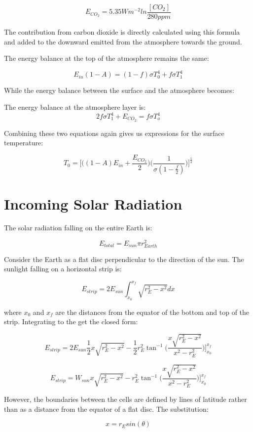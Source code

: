 \documentclass[12pt]{article} %
\begin{document}
$$ E_{CO_2} = 5.35 W m^{-2} ln \frac{[CO_2]}{280ppm}$$

The contribution from carbon dioxide is directly calculated using this formula and added to the downward emitted from the atmosphere towards the ground.


The energy balance at the top of the atmosphere remains the same:

$$ E_{in}(1-A)  = (1-f) \sigma T_0^4 + f \sigma T_1^4$$

While the energy balance between the surface and the atmosphere becomes:

The energy balance at the atmosphere layer is: 
$$2f\sigma T_1^4 + E_{CO_2} = f\sigma T_o^4$$

Combining these two equations again gives us expressions for the surface temperature:

$$\boxed{T_0 = \bigg[ \bigg((1-A)E_{in} + \frac{E_{CO_2}}{2}\bigg)\bigg(\frac{1}{\sigma(1-\frac{f}{2})}\bigg)\bigg] ^{\frac{1}{4}}}$$

\newpage
\section{Incoming Solar Radiation}
\label{sec:radiation}

The solar radiation falling on the entire Earth is:

$$E_{total} = E_{sun} \pi r_{Earth}^2$$

Consider the Earth as a flat disc perpendicular to the direction of the sun. The sunlight falling on a horizontal strip is:

$$E_{strip} = 2 E_{sun} \int_{x_0}^{x_f} \sqrt{r_{E}^2 - x^2} dx$$


where $x_0$ and $x_f$ are the distances from the equator of the bottom and top of the strip. Integrating to the get the closed form:

$$E_{strip} = 2 E_{sun} \frac{1}{2} x \sqrt{r_{E}^2 - x^2} - \frac{1}{2} r_{E}^2 \tan^{-1}\bigg({\frac{x \sqrt{r_{E}^2 - x^2}}{x^2 - r_{E}^2 }}\bigg)\bigg]_{x_0}^{x_f}$$

$$E_{strip} = W_{sun} x \sqrt{r_{E}^2 - x^2} -  r_{E}^2 \tan^{-1}\bigg({\frac{x \sqrt{r_{E}^2 - x^2}}{x^2 - r_{E}^2 }}\bigg)\bigg]_{x_0}^{x_f}$$

However, the boundaries between the cells are defined by lines of latitude rather than as a distance from the equator of a flat disc. The substitution: 

$$x = r_{E} sin(\theta) $$
\end{document}
